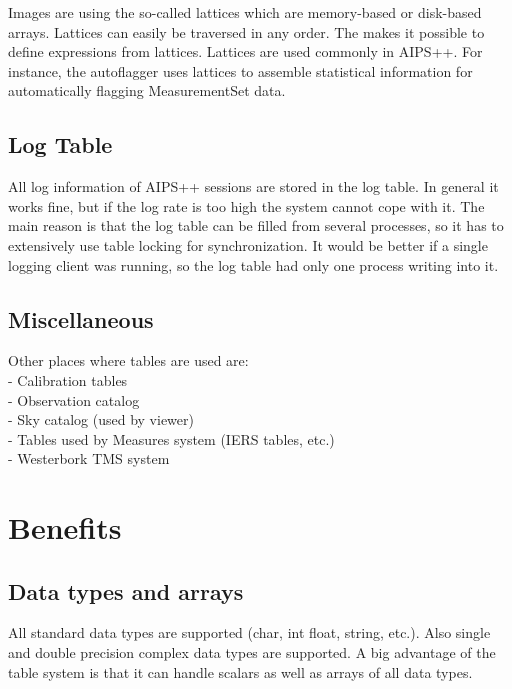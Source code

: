 Images are using the so-called lattices which are memory-based or
disk-based arrays. Lattices can easily be traversed in any order.
The 
makes it possible to define expressions from lattices.
Lattices are used commonly in AIPS++. For instance, the autoflagger
uses lattices to assemble statistical information for automatically
flagging MeasurementSet data.

\subsection{Log Table}
All log information of AIPS++ sessions are stored in the log table.
In general it works fine, but if the log rate is too high the system
cannot cope with it. The main reason is that the log table can be
filled from several processes, so it has to extensively use table
locking for synchronization. It would be better if a single logging
client was running, so the log table had only one process writing into
it.

\subsection{Miscellaneous}
Other places where tables are used are:
\\- Calibration tables
\\- Observation catalog
\\- Sky catalog (used by viewer)
\\- Tables used by Measures system (IERS tables, etc.)
\\- Westerbork TMS system

\section{Benefits}
\subsection{Data types and arrays}
All standard data types are supported (char, int float, string, etc.).
Also single and double precision complex data types are supported.
A big advantage of the table system is that it can handle scalars as well
as arrays of all data types.

